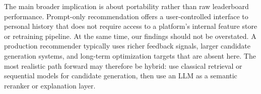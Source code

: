  The main broader implication is about portability rather than raw leaderboard performance. Prompt-only recommendation offers a user-controlled interface to personal history that does not require access to a platform's internal feature store or retraining pipeline. At the same time, our findings should not be overstated. A production recommender typically uses richer feedback signals, larger candidate generation systems, and long-term optimization targets that are absent here. The most realistic path forward may therefore be hybrid: use classical retrieval or sequential models for candidate generation, then use an LLM as a semantic reranker or explanation layer.

